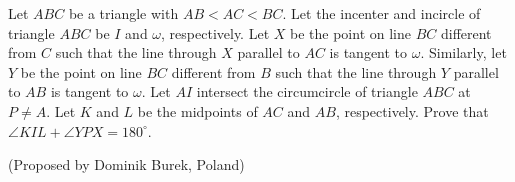 Let $ABC$ be a triangle with $AB < AC < BC$. Let the incenter and incircle of triangle $ABC$ be $I$ and $\omega$, respectively. Let $X$ be the point on line $BC$ different from $C$ such that the line through $X$ parallel to $AC$ is tangent to $\omega$. Similarly, let $Y$ be the point on line $BC$ different from $B$ such that the line through $Y$ parallel to $AB$ is tangent to $\omega$. Let $AI$ intersect the circumcircle of triangle $ABC$ at $P \ne A$. Let $K$ and $L$ be the midpoints of $AC$ and $AB$, respectively.
Prove that $\angle KIL + \angle YPX = 180^{\circ}$.

(Proposed by Dominik Burek, Poland)